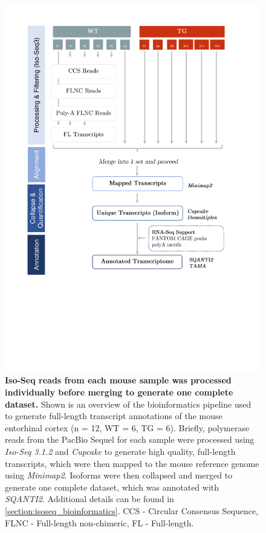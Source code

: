 \begin{figure}[htp]
	\centering
	\vspace{20pt}
	\includegraphics[page=1,trim={0 7cm 2cm 1cm},clip, scale = 0.7]{Figures/WholeTranscriptome_Figures.pdf}
	\captionsetup{width=0.95\textwidth}
	\caption[Detailed Iso-Seq bioinformatics pipeline for global transcriptome profiling]%
	{\textbf{Iso-Seq reads from each mouse sample was processed individually before merging to generate one complete dataset.} Shown is an overview of the bioinformatics pipeline used to generate full-length transcript annotations of the mouse entorhinal cortex (n = 12, WT = 6, TG = 6). Briefly, polymerase reads from the PacBio Sequel for each sample were processed using \textit{Iso-Seq 3.1.2} and \textit{Cupcake} to generate high quality, full-length transcripts, which were then mapped to the mouse reference genome using \textit{Minimap2}. Isoforms were then collapsed and merged to generate one complete dataset, which was annotated with \textit{SQANTI2}. Additional details can be found in \cref{section:isoseq_bioinformatics}. CCS - Circular Consensus Sequence, FLNC - Full-length non-chimeric, FL - Full-length.}
	\label{fig:isoseq_whole_pipeline}
\end{figure}
 
